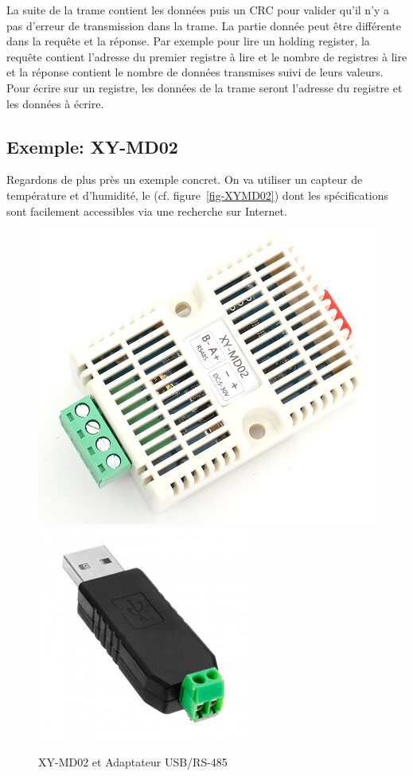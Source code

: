     \vspace{1em}

La suite de la trame contient les données puis un \ac{CRC} pour valider qu'il n'y a pas d'erreur de transmission dans la trame. La partie donnée peut être différente dans la requête et la réponse. Par exemple pour lire un holding register, la requête contient l'adresse du premier registre à lire et le nombre de registres à lire et la réponse contient le nombre de données transmises suivi de leurs valeurs. Pour écrire sur un registre, les données de la trame seront l'adresse du registre et les données à écrire.

\subsection{Exemple: XY-MD02}


Regardons de plus près un exemple concret. On va utiliser un capteur de température et d'humidité, le  (cf. figure~\vref{fig-XYMD02}) dont les spécifications sont facilement accessibles via une recherche sur Internet. 

\begin{figure}[tbp]
\centerline{\includegraphics[width=0.6\columnwidth]{Pictures/XY-MD02.png}\includegraphics[width=0.4\columnwidth]{Pictures/rs485-usb.png}}
\caption{XY-MD02 et Adaptateur USB/RS-485}
\label{fig-XYMD02}
\end{figure}

